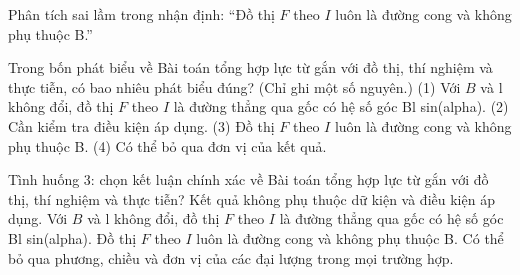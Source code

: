 \begin{bt}
Phân tích sai lầm trong nhận định: “Đồ thị $F$ theo $I$ luôn là đường cong và không phụ thuộc B.”
\end{bt}

\begin{ex}
Trong bốn phát biểu về Bài toán tổng hợp lực từ gắn với đồ thị, thí nghiệm và thực tiễn, có bao nhiêu phát biểu đúng? (Chỉ ghi một số nguyên.) (1) Với $B$ và l không đổi, đồ thị $F$ theo $I$ là đường thẳng qua gốc có hệ số góc Bl sin(alpha). (2) Cần kiểm tra điều kiện áp dụng. (3) Đồ thị $F$ theo $I$ luôn là đường cong và không phụ thuộc B. (4) Có thể bỏ qua đơn vị của kết quả.
\end{ex}

\begin{ex}
Tình huống 3: chọn kết luận chính xác về Bài toán tổng hợp lực từ gắn với đồ thị, thí nghiệm và thực tiễn?
\choice
{Kết quả không phụ thuộc dữ kiện và điều kiện áp dụng.}
{\True Với $B$ và l không đổi, đồ thị $F$ theo $I$ là đường thẳng qua gốc có hệ số góc Bl sin(alpha).}
{Đồ thị $F$ theo $I$ luôn là đường cong và không phụ thuộc B.}
{Có thể bỏ qua phương, chiều và đơn vị của các đại lượng trong mọi trường hợp.}
\end{ex}

